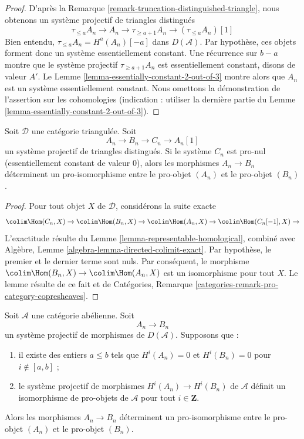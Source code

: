 \begin{proof}
D'après la Remarque \ref{remark-truncation-distinguished-triangle}, nous
obtenons un système projectif de triangles distingués
$$
\tau_{\leq a}A_n \to A_n \to \tau_{\geq a + 1}A_n \to (\tau_{\leq a}A_n)[1]
$$
Bien entendu, $\tau_{\leq a}A_n = H^a(A_n)[-a]$ dans $D(\mathcal{A})$.
Par hypothèse, ces objets forment donc un système essentiellement constant.
Une récurrence sur $b - a$ montre que le système projectif
$\tau_{\geq a + 1}A_n$ est essentiellement constant, disons de valeur $A'$.
Le Lemme \ref{lemma-essentially-constant-2-out-of-3} montre alors que $A_n$
est un système essentiellement constant. Nous omettons la démonstration de
l'assertion sur les cohomologies (indication : utiliser la dernière partie du
Lemme \ref{lemma-essentially-constant-2-out-of-3}).
\end{proof}

\begin{lemma}
\label{lemma-pro-isomorphism}
Soit $\mathcal{D}$ une catégorie triangulée. Soit
$$
A_n \to B_n \to C_n \to A_n[1]
$$
un système projectif de triangles distingués. Si le système $C_n$ est
pro-nul (essentiellement constant de valeur $0$), alors les morphismes
$A_n \to B_n$ déterminent un pro-isomorphisme entre le pro-objet $(A_n)$ et
le pro-objet $(B_n)$.
\end{lemma}

\begin{proof}
Pour tout objet $X$ de $\mathcal{D}$, considérons la suite exacte
$$
\colim \Hom(C_n, X) \to
\colim \Hom(B_n, X) \to
\colim \Hom(A_n, X) \to
\colim \Hom(C_n[-1], X) \to
$$
L'exactitude résulte du Lemme \ref{lemma-representable-homological}, combiné
avec Algèbre, Lemme \ref{algebra-lemma-directed-colimit-exact}.
Par hypothèse, le premier et le dernier terme sont nuls. Par conséquent, le
morphisme
$\colim \Hom(B_n, X) \to \colim \Hom(A_n, X)$ est un isomorphisme pour tout
$X$. Le lemme résulte de ce fait et de Catégories, Remarque
\ref{categories-remark-pro-category-copresheaves}.
\end{proof}

\begin{lemma}
\label{lemma-pro-isomorphism-bis}
Soit $\mathcal{A}$ une catégorie abélienne. Soit
$$
A_n \to B_n
$$
un système projectif de morphismes de $D(\mathcal{A})$. Supposons que :
\begin{enumerate}
\item il existe des entiers $a \leq b$ tels que $H^i(A_n) = 0$
et $H^i(B_n) = 0$ pour $i \not \in [a, b]$ ;
\item le système projectif de morphismes
$H^i(A_n) \to H^i(B_n)$ de $\mathcal{A}$ définit un isomorphisme de
pro-objets de $\mathcal{A}$ pour tout $i \in \mathbf{Z}$.
\end{enumerate}
Alors les morphismes $A_n \to B_n$ déterminent un pro-isomorphisme entre le
pro-objet $(A_n)$ et le pro-objet $(B_n)$.
\end{lemma}

